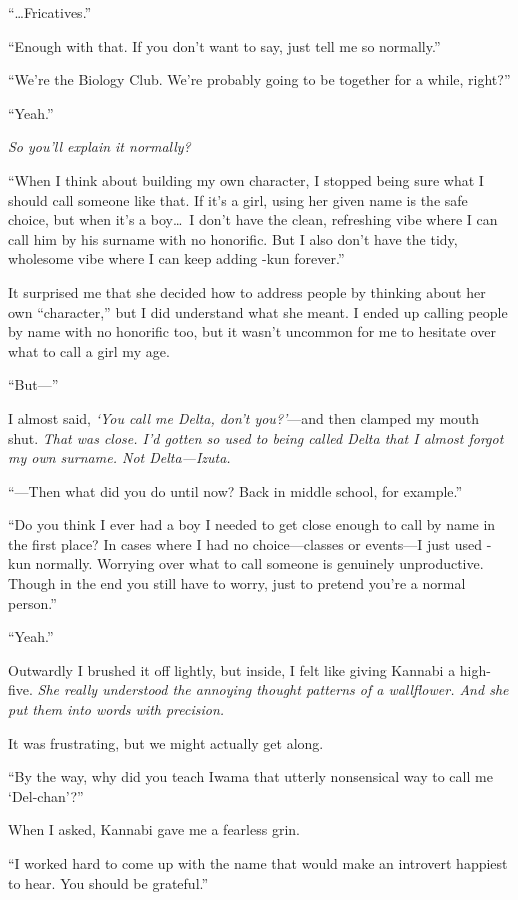 \documentclass[
    a4paper,
    12pt,
    twoside,
    openany,
    UTF8,
    fontset=windows
]{ctexbook}
\begin{document}
``\dots Fricatives.''

``Enough with that. If you don't want to say, just tell me so normally.''

``We're the Biology Club. We're probably going to be together for a while, right?''

``Yeah.''

\textit{So you'll explain it normally?}

``When I think about building my own character, I stopped being sure what I should call someone like that. If it's a girl, using her given name is the safe choice, but when it's a boy\dots\ I don't have the clean, refreshing vibe where I can call him by his surname with no honorific. But I also don't have the tidy, wholesome vibe where I can keep adding -kun forever.''

It surprised me that she decided how to address people by thinking about her own ``character,'' but I did understand what she meant. I ended up calling people by name with no honorific too, but it wasn't uncommon for me to hesitate over what to call a girl my age.

``But---''

I almost said, \textit{`You call me Delta, don't you?'}---and then clamped my mouth shut. \textit{That was close. I'd gotten so used to being called Delta that I almost forgot my own surname. Not Delta---Izuta.}

``---Then what did you do until now? Back in middle school, for example.''

``Do you think I ever had a boy I needed to get close enough to call by name in the first place? In cases where I had no choice---classes or events---I just used -kun normally. Worrying over what to call someone is genuinely unproductive. Though in the end you still have to worry, just to pretend you're a normal person.''

``Yeah.''

Outwardly I brushed it off lightly, but inside, I felt like giving Kannabi a high-five. \textit{She really understood the annoying thought patterns of a wallflower. And she put them into words with precision.}

It was frustrating, but we might actually get along.

``By the way, why did you teach Iwama that utterly nonsensical way to call me `Del-chan'?''

When I asked, Kannabi gave me a fearless grin.

``I worked hard to come up with the name that would make an introvert happiest to hear. You should be grateful.''
\end{document}
